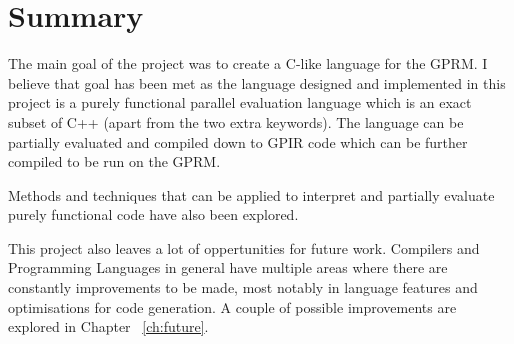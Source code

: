 \section{Summary}
The main goal of the project was to create a C-like language for the GPRM.
I believe that goal has been met as the language designed and implemented 
in this project is a purely functional parallel evaluation language which is an exact subset of C++ 
(apart from the two extra keywords). The language can be partially evaluated and compiled down to GPIR code 
which can be further compiled to be run on the GPRM. 

Methods and techniques that can be applied to interpret and partially evaluate purely
functional code have also been explored.

This project also leaves a lot of oppertunities for future work. Compilers and Programming Languages in general have
multiple areas where there are constantly improvements to be made, most notably in language features and optimisations 
for code generation. A couple of possible improvements are explored in Chapter ~\ref{ch:future}.





